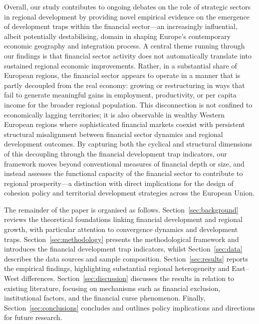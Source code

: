 \documentclass[a4paper,11pt,oneside]{article}
\begin{document}
Overall, our study contributes to ongoing debates on the role of strategic sectors in regional development \citep{balland2019smart} by providing novel empirical evidence on the emergence of development traps within the financial sector---an increasingly influential, albeit potentially destabilising, domain in shaping Europe's contemporary economic geography and integration process. A central theme running through our findings is that financial sector activity does not automatically translate into sustained regional economic improvements. Rather, in a substantial share of European regions, the financial sector appears to operate in a manner that is partly decoupled from the real economy: growing or restructuring in ways that fail to generate meaningful gains in employment, productivity, or per capita income for the broader regional population. This disconnection is not confined to economically lagging territories; it is also observable in wealthy Western European regions where sophisticated financial markets coexist with persistent structural misalignment between financial sector dynamics and regional development outcomes. By capturing both the cyclical and structural dimensions of this decoupling through the financial development trap indicators, our framework moves beyond conventional measures of financial depth or size, and instead assesses the functional capacity of the financial sector to contribute to regional prosperity---a distinction with direct implications for the design of cohesion policy and territorial development strategies across the European Union.




The remainder of the paper is organised as follows. Section~\ref{sec:background} reviews the theoretical foundations linking financial development and regional growth, with particular attention to convergence dynamics and development traps. Section~\ref{sec:methodology} presents the methodological framework and introduces the financial development trap indicators, whilst Section~\ref{sec:data} describes the data sources and sample composition. Section~\ref{sec:results} reports the empirical findings, highlighting substantial regional heterogeneity and East--West differences. Section~\ref{sec:discussion} discusses the results in relation to existing literature, focusing on mechanisms such as financial exclusion, institutional factors, and the financial curse phenomenon. Finally, Section~\ref{sec:conclusions} concludes and outlines policy implications and directions for future research.
\end{document}
